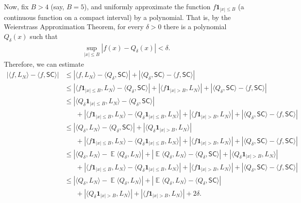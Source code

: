 \documentclass[letterpaper,11pt,oneside,reqno]{amsart}
\numberwithin{equation}{section}
\newcommand{\SC}{\mathsf{SC}}
\DeclareMathOperator{\EE}{\mathbb{E}}
\theoremstyle{definition}
\begin{document}
Now, fix $B>4$ (say, $B=5$), and uniformly approximate the function 
$f\mathbf{1}_{|x|\le B}$ (a continuous function on a compact interval)
by a polynomial. That is, by the Weierstrass Approximation Theorem,
for every $\delta>0$ there is a polynomial
$Q_\delta(x)$ such that
\begin{align*}
	\sup_{|x|\le B}|f(x)-Q_{\delta}(x)|<\delta.
\end{align*}
Therefore, we can estimate
\begin{align*}
	\left|
	\langle f,L_N\rangle-
	\langle f,\SC\rangle
	\right|&\le
	\left|
	\langle f,L_N\rangle-
	\langle Q_{\delta},\SC\rangle
	\right|+
	\left|
	\langle Q_{\delta},\SC\rangle-
	\langle f,\SC\rangle
	\right|
	\\&\le
	\left|
	\langle f\mathbf{1}_{|x|\le B},L_N\rangle-
	\langle Q_{\delta},\SC\rangle
	\right|
	+
	\left|
	\langle f\mathbf{1}_{|x|> B},L_N\rangle
	\right|+
	\left|
	\langle Q_{\delta},\SC\rangle-
	\langle f,\SC\rangle
	\right|
	\\&\le
	\left|
	\langle Q_{\delta}\mathbf{1}_{|x|\le B},L_N\rangle-
	\langle Q_{\delta},\SC\rangle
	\right|\\&\hspace{20pt}+
	\left|
	\langle f\mathbf{1}_{|x|\le B},L_N\rangle-
	\langle Q_{\delta}\mathbf{1}_{|x|\le B},L_N\rangle
	\right|
	+
	\left|
	\langle f\mathbf{1}_{|x|> B},L_N\rangle
	\right|+
	\left|
	\langle Q_{\delta},\SC\rangle-
	\langle f,\SC\rangle
	\right|
	\\&\le
	\left|
	\langle Q_{\delta},L_N\rangle-
	\langle Q_{\delta},\SC\rangle
	\right|
	+
	\left|
	\langle Q_{\delta}\mathbf{1}_{|x|> B},L_N\rangle
	\right|\\&\hspace{20pt}+
	\left|
	\langle f\mathbf{1}_{|x|\le B},L_N\rangle-
	\langle Q_{\delta}\mathbf{1}_{|x|\le B},L_N\rangle
	\right|
	+
	\left|
	\langle f\mathbf{1}_{|x|> B},L_N\rangle
	\right|+
	\left|
	\langle Q_{\delta},\SC\rangle-
	\langle f,\SC\rangle
	\right|
	\\&\le
	\left|
	\langle Q_{\delta},L_N\rangle-
	\EE\langle Q_{\delta},L_N\rangle
	\right|
	+
	\left|
	\EE\langle Q_{\delta},L_N\rangle-
	\langle Q_{\delta},\SC\rangle
	\right|
	+
	\left|
	\langle Q_{\delta}\mathbf{1}_{|x|> B},L_N\rangle
	\right|\\&\hspace{20pt}+
	\left|
	\langle f\mathbf{1}_{|x|\le B},L_N\rangle-
	\langle Q_{\delta}\mathbf{1}_{|x|\le B},L_N\rangle
	\right|
	+
	\left|
	\langle f\mathbf{1}_{|x|> B},L_N\rangle
	\right|+
	\left|
	\langle Q_{\delta},\SC\rangle-
	\langle f,\SC\rangle
	\right|
	\\&\le
	\left|
	\langle Q_{\delta},L_N\rangle-
	\EE\langle Q_{\delta},L_N\rangle
	\right|
	+
	\left|
	\EE\langle Q_{\delta},L_N\rangle-
	\langle Q_{\delta},\SC\rangle
	\right|
	\\&\hspace{20pt}+
	\left|
	\langle Q_{\delta}\mathbf{1}_{|x|> B},L_N\rangle
	\right|+
	\left|
	\langle f\mathbf{1}_{|x|> B},L_N\rangle
	\right|+2 \delta.
\end{align*}
\end{document}
